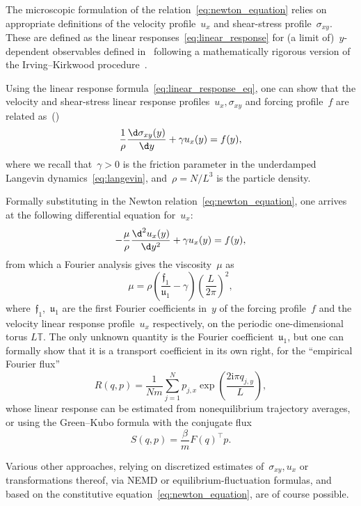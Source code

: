 The microscopic formulation of the relation~\eqref{eq:newton_equation} relies on appropriate definitions of the velocity profile~$u_x$ and shear-stress profile~$\sigma_{xy}$. These are defined as the linear responses~\eqref{eq:linear_response} for (a limit of)~$y$-dependent observables defined in~\cite{js12} following a mathematically rigorous version of the Irving--Kirkwood procedure~\cite{irving_kirkwood_1950}.

Using the linear response formula~\eqref{eq:linear_response_eq}, one can show that the velocity and shear-stress linear response profiles~$u_x,\sigma_{xy}$ and forcing profile~$f$ are related as~(\cite[Proposition 1]{js12})
\begin{equation}
    \frac{1}{\rho}\frac{\d\sigma_{xy}(y)}{\d y}  + \gamma u_x(y) = f(y),
\end{equation}
where we recall that~$\gamma>0$ is the friction parameter in the underdamped Langevin dynamics~\eqref{eq:langevin}, and~$\rho=N/L^3$ is the particle density.

Formally substituting in the Newton relation~\eqref{eq:newton_equation}, one arrives at the following differential equation for~$u_x$:
\begin{equation}
    -\frac{\mu}{\rho}\frac{\d^2 u_x(y)}{\d y^2} + \gamma u_x(y) = f(y),
\end{equation}
from which a Fourier analysis gives the viscosity~$\mu$ as
\begin{equation}
    \label{eq:viscosity_equation}
    \mu = \rho\left(\frac{\mathfrak{f}_1}{\mathfrak{u}_1}-\gamma\right)\left(\frac{L}{2\pi}\right)^2,
\end{equation}
where~$\mathfrak{f}_1$,~$\mathfrak{u}_1$ are the first Fourier coefficients in~$y$ of the forcing profile~$f$ and the velocity linear response profile~$u_x$ respectively, on the periodic one-dimensional torus $L\mathbb T$.
The only unknown quantity is the Fourier coefficient~$\mathfrak{u}_1$, but one can formally show that it is a transport coefficient in its own right, for the ``empirical Fourier flux''
\begin{equation}
\label{eq:fourier_flux}
    R(q,p) = \frac1{Nm}\sum_{j=1}^N p_{j,x}\exp\left(\frac{2\mathrm{i}\pi q_{j,y}}{L}\right),
\end{equation}
whose linear response can be estimated from nonequilibrium trajectory averages, or using the Green--Kubo formula with the conjugate flux
\begin{equation}
    S(q,p) = \frac{\beta}{m} F(q)^\top p. 
\end{equation}

Various other approaches, relying on discretized estimates of~$\sigma_{xy},u_x$ or transformations thereof, via NEMD or equilibrium-fluctuation formulas, and based on the constitutive equation~\eqref{eq:newton_equation}, are of course possible.
